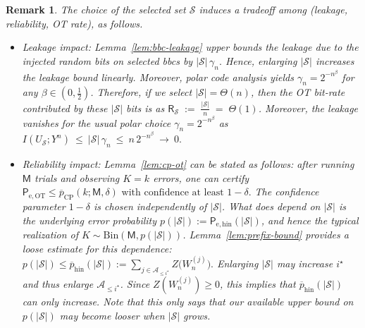 \documentclass[onecolumn]{IEEEtran} %
\newcommand{\1}{\mathbbm{1}}
\theoremstyle{boldremark}
\newtheorem{remark}{Remark}
\begin{document}
\begin{remark}\label{rem:S_tradeoff}
The choice of the selected set $\mathcal{S}$ induces a tradeoff among
(leakage, reliability, OT rate), as follows.
\begin{itemize}
\item \emph{Leakage impact:}
Lemma~\ref{lem:bbc-leakage} upper bounds the leakage due to the injected random bits on
selected \gls{bbcs} by $|\mathcal{S}|\,\gamma_n.$
Hence, enlarging $|\mathcal{S}|$ increases the leakage bound linearly.
Moreover, polar code analysis yields $\gamma_n=2^{-n^{\beta}}$ for any
$\beta\in(0,\tfrac12)$. Therefore, if we select \(|\mathcal S|=\Theta(n)\), then the OT bit-rate contributed by these
\(|\mathcal S|\) bits is as
$\textsf{R}_{\mathcal S}\;:=\;\frac{|\mathcal S|}{n}\;=\;\Theta(1)$. Moreover, the leakage vanishes for the usual polar choice \(\gamma_n = 2^{-n^{\beta}}\) as $
I(U_{\mathcal S};Y^n)\ \le\ |\mathcal S|\,\gamma_n\ \le\ n\,2^{-n^{\beta}}\ \to\ 0.$


\item \emph{Reliability impact:}
Lemma~\ref{lem:cp-ot} can be stated as follows: after running \(\textsf{M}\) trials and observing
\(K=k\) errors, one can certify
$  \textsf{P}_{\mathrm{e,OT}}\le \overline p_{\mathrm{CP}}(k;\textsf{M},\delta)
  \text{ with confidence at least } 1-\delta .$ The confidence parameter \(1-\delta\) is chosen independently of \(|\mathcal S|\).
What \emph{does} depend on \(|\mathcal S|\) is the underlying error probability
\(p(|\mathcal S|):=\textsf{P}_{\mathrm{e,hin}}(|\mathcal S|)\), and hence the typical realization of
\(K\sim\mathrm{Bin}(\textsf{M},p(|\mathcal S|))\). Lemma~\ref{lem:prefix-bound} provides a loose estimate for this dependence: $  p(|\mathcal S|)\le \overline p_{\mathrm{hin}}(|\mathcal S|)
  := \sum_{j\in\mathcal{A}_{\le i^\star}} Z\!\bigl(W_n^{(j)}\bigr).$ Enlarging \(|\mathcal S|\) may increase \(i^\star\) and thus enlarge \(\mathcal{A}_{\le i^\star}\). Since
\(Z(W_n^{(j)})\ge 0\), this implies that \(\overline p_{\mathrm{hin}}(|\mathcal S|)\) can only increase.
Note that this only says that
our \emph{available upper bound} on \(p(|\mathcal S|)\) may become looser when \(|\mathcal S|\) grows.


\end{itemize}
\end{remark}
\end{document}
